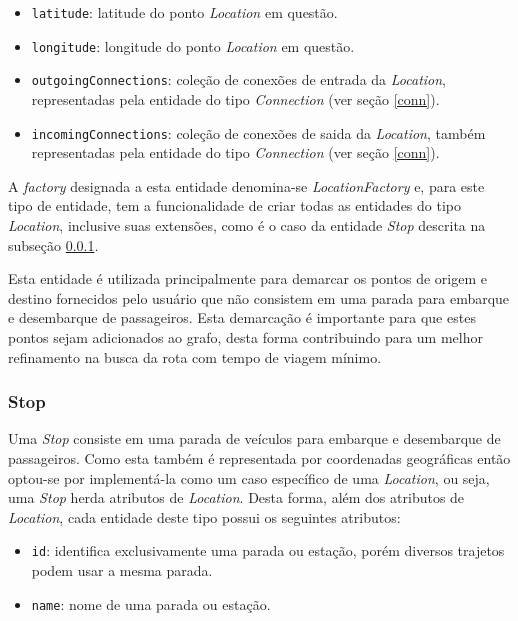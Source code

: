 \begin{itemize}
	\item \texttt{latitude}: latitude do ponto \emph{Location} em questão.
	\item \texttt{longitude}: longitude do ponto \emph{Location} em questão.
	\item \texttt{outgoingConnections}: coleção de conexões de entrada da \emph{Location}, representadas pela entidade do tipo \emph{Connection} (ver seção 					  \ref{conn}).
	\item \texttt{incomingConnections}: coleção de conexões de saida da \emph{Location}, também representadas pela entidade do tipo \emph{Connection} (ver seção 			  	  \ref{conn}).
\end{itemize}

A \emph{factory} designada a esta entidade denomina-se \emph{LocationFactory} e, para este tipo de entidade, tem a funcionalidade de criar todas as entidades do tipo \emph{Location}, inclusive  suas extensões, como é o caso da entidade \emph{Stop} descrita na subseção \ref{stop}.

Esta entidade é utilizada principalmente para demarcar os pontos de origem e destino fornecidos pelo usuário que não consistem em uma parada para embarque e desembarque de passageiros.
Esta demarcação é importante para que estes pontos sejam adicionados ao grafo, desta forma contribuindo para um melhor refinamento na busca da rota com tempo de viagem mínimo.

\subsubsection{Stop}
\label{stop}
Uma \emph{Stop} consiste em uma parada de veículos para embarque e desembarque de passageiros.
Como esta também é representada por coordenadas geográficas então optou-se por implementá-la como um caso específico de uma \emph{Location}, ou seja, uma \emph{Stop} herda atributos de \emph{Location}. Desta forma, além dos atributos de \emph{Location}, cada entidade deste tipo possui os seguintes atributos:

\begin{itemize}
	\item \texttt{id}: identifica exclusivamente uma parada ou estação, porém diversos trajetos podem usar a mesma parada.
	\item \texttt{name}: nome de uma parada ou estação.
\end{itemize}

